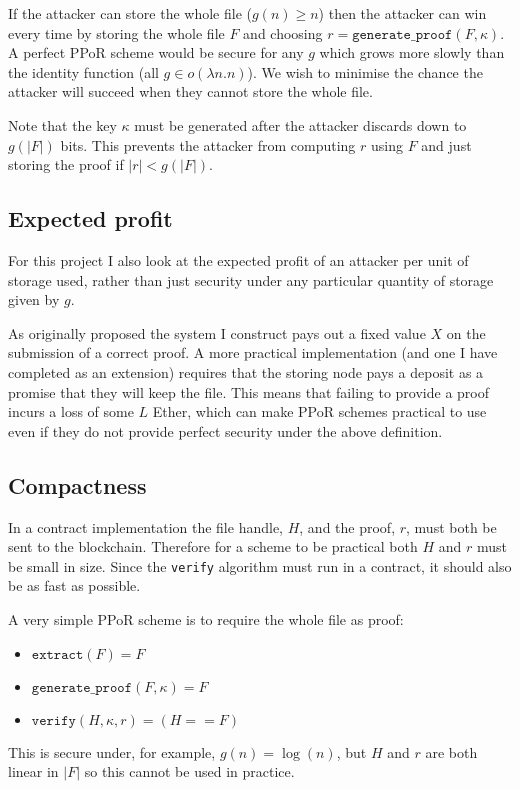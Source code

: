 \documentclass[12pt,a4paper,twoside,openright]{report}
\begin{document}
If the attacker can store the whole file ($g(n) \geq n$) then the attacker can win every time by storing the whole file $F$ and choosing $r = \texttt{generate\_proof}(F, \kappa)$.
A perfect PPoR scheme would be secure for any $g$ which grows more slowly than the identity function (all $g \in o(\lambda n. n)$).
We wish to minimise the chance the attacker will succeed when they cannot store the whole file.

Note that the key $\kappa$ must be generated after the attacker discards down to $g(|F|)$ bits.
This prevents the attacker from computing $r$ using $F$ and just storing the proof if $|r| < g(|F|)$.


\subsection{Expected profit}

For this project I also look at the expected profit of an attacker per unit of storage used,
rather than just security under any particular quantity of storage given by $g$.

As originally proposed the system I construct pays out a fixed value $X$ on the submission of a correct proof.
A more practical implementation (and one I have completed as an extension) requires that the storing node pays a deposit
as a promise that they will keep the file. This means that failing to provide a proof incurs a loss of some $L$ Ether,
which can make PPoR schemes practical to use even if they do not provide perfect security under the above definition.


\subsection{Compactness}

In a contract implementation the file handle, ${H}$, and the proof, $r$, must both be sent to the blockchain.
Therefore for a scheme to be practical both ${H}$ and $r$ must be small in size.
Since the \texttt{verify} algorithm must run in a contract, it should also be as fast as possible.


A very simple PPoR scheme is to require the whole file as proof:
\begin{itemize}
\item $\texttt{extract}(F) = F$

\item $\texttt{generate\_proof}(F, \kappa) = F$

\item $\texttt{verify}({H}, \kappa, r) = ({H} == F)$
\end{itemize}
This is secure under, for example, $g(n) = \log(n)$, but ${H}$ and $r$ are both linear in $|F|$
so this cannot be used in practice.
\end{document}
